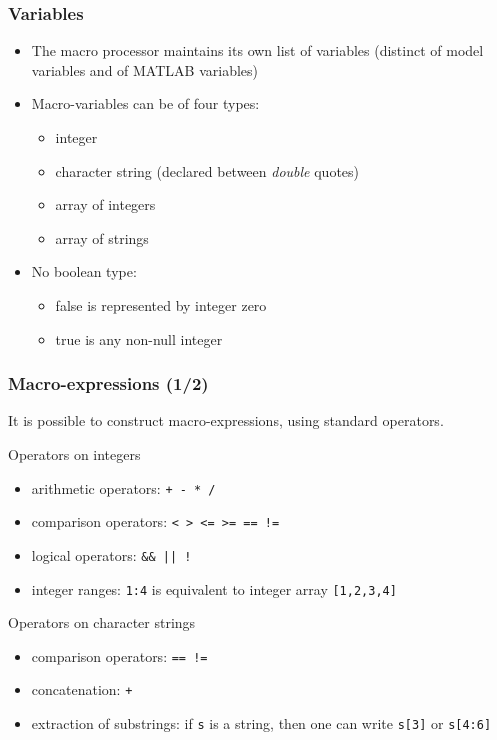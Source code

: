\documentclass{beamer}
\begin{document}
\begin{frame}
\frametitle{Variables}
\begin{itemize}
\item The macro processor maintains its own list of variables (distinct of model variables and of MATLAB variables)
\item Macro-variables can be of four types:
  \begin{itemize}
  \item integer
  \item character string (declared between \textit{double} quotes)
  \item array of integers
  \item array of strings
  \end{itemize}
\item No boolean type:
  \begin{itemize}
  \item false is represented by integer zero
  \item true is any non-null integer
  \end{itemize}
\end{itemize}
\end{frame}

\begin{frame}[fragile=singleslide]
  \frametitle{Macro-expressions (1/2)}
  It is possible to construct macro-expressions, using standard operators.
  \begin{block}{Operators on integers}
    \begin{itemize}
    \item arithmetic operators: \texttt{+ - * /}
    \item comparison operators: \texttt{< > <= >= == !=}
    \item logical operators: \verb+&& || !+
    \item integer ranges: \texttt{1:4} is equivalent to integer array \texttt{[1,2,3,4]}
    \end{itemize}
  \end{block}

  \begin{block}{Operators on character strings}
    \begin{itemize}
    \item comparison operators: \texttt{== !=}
    \item concatenation: \texttt{+}
    \item extraction of substrings: if \texttt{s} is a string, then one can write \texttt{s[3]} or \texttt{s[4:6]}
    \end{itemize}
  \end{block}
\end{frame}
\end{document}
